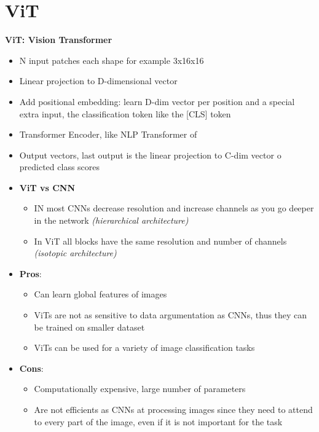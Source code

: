 \section{ViT}
\textbf{ViT: Vision Transformer}
\begin{itemize}
    \item N input patches each shape for example 3x16x16
    \item Linear projection to D-dimensional vector
    \item Add positional embedding: learn D-dim vector per position and a special extra input, the classification token like the [CLS] token
    \item Transformer Encoder, like NLP Transformer
    of\item Output vectors, last output is the linear projection to C-dim vector o predicted class scores
    \item \textbf{ViT vs CNN}
    \begin{itemize}
        \item IN most CNNs decrease resolution and increase channels as you go deeper in the network \textit{(hierarchical architecture)}
        \item In ViT all blocks have the same resolution and number of channels \textit{(isotopic architecture)}
    \end{itemize}
    \item \textbf{Pros}:
    \begin{itemize}
        \item Can learn global features of images
        \item ViTs are not as sensitive to data argumentation as CNNs, thus they can be trained on smaller dataset
        \item ViTs can be used for a variety of image classification tasks
    \end{itemize}
    \item \textbf{Cons}:
    \begin{itemize}
        \item Computationally expensive, large number of parameters
        \item Are not efficients as CNNs at processing images since they need to attend to every part of the image, even if it is not important for the task
    \end{itemize}
\end{itemize}


